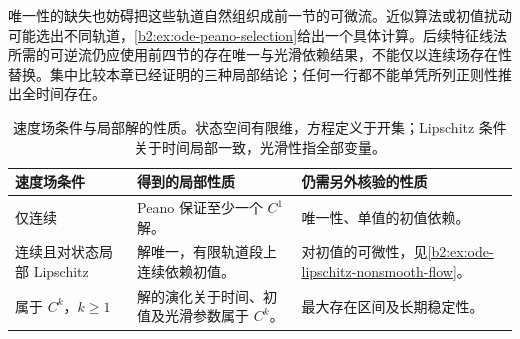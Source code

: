 \ProseParagraphBreak

唯一性的缺失也妨碍把这些轨道自然组织成前一节的可微流。近似算法或初值扰动可能选出不同轨道，\cref{b2:ex:ode-peano-selection}给出一个具体计算。后续特征线法所需的可逆流仍应使用前四节的存在唯一与光滑依赖结果，不能仅以连续场存在性替换。集中比较本章已经证明的三种局部结论；任何一行都不能单凭所列正则性推出全时间存在。

\begin{table}[htbp]
\centering
\small
\caption[速度场条件与局部解的性质]{速度场条件与局部解的性质。状态空间有限维，方程定义于开集；Lipschitz 条件关于时间局部一致，光滑性指全部变量。}
\label{b2:tab:ode-regularity}
\begin{tabularx}{\linewidth}{@{}>{\raggedright\arraybackslash}p{2.8cm}>{\raggedright\arraybackslash}X>{\raggedright\arraybackslash}X@{}}
\toprule
速度场条件 & 得到的局部性质 & 仍需另外核验的性质 \\
\midrule
仅连续 & Peano 保证至少一个 \(C^1\) 解。 & 唯一性、单值的初值依赖。 \\
连续且对状态局部 Lipschitz & 解唯一，有限轨道段上连续依赖初值。 & 对初值的可微性，见\cref{b2:ex:ode-lipschitz-nonsmooth-flow}。 \\
属于 \(C^k\)，\(k\geq1\) & 解的演化关于时间、初值及光滑参数属于 \(C^k\)。 & 最大存在区间及长期稳定性。 \\
\bottomrule
\end{tabularx}
\end{table}
